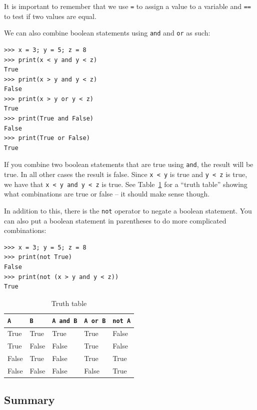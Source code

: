 \documentclass[11pt]{cselabheader}
\begin{document}
It is important to remember that we use \lstinline{=} to assign a value to a variable and \lstinline{==} to test if two values are equal.

We can also combine boolean statements using \lstinline!and! and \lstinline!or!
as such:
\begin{lstlisting}[style=ipython]
>>> x = 3; y = 5; z = 8
>>> print(x < y and y < z)
True
>>> print(x > y and y < z)
False
>>> print(x > y or y < z)
True
>>> print(True and False)
False
>>> print(True or False)
True
\end{lstlisting}
If you combine two boolean statements that are true using \lstinline!and!, the
result will be true. In all other cases the result is false. Since 
\lstinline!x < y! is true and \lstinline!y < z! is true, we have that 
\lstinline!x < y and y < z! is true. See Table~\ref{tab:truth} for a ``truth
table'' showing what combinations are true or false -- it should make sense
though.

In addition to this, there is the \lstinline!not! operator to negate a boolean
statement. You can also put a boolean statement in parentheses to do more
complicated combinations:
\begin{lstlisting}[style=ipython]
>>> x = 3; y = 5; z = 8
>>> print(not True)
False
>>> print(not (x > y and y < z))
True
\end{lstlisting}

\begin{table}[!ht]
  \centering
  \begin{tabular}{ll | lll}
    \toprule
    \lstinline!A! & \lstinline!B! & \lstinline!A and B! & \lstinline!A or B! & \lstinline!not A! \\
    \midrule
    True & True & True & True & False\\
    True & False & False & True & False\\
    False & True & False & True & True\\
    False & False & False & False & True \\
    \bottomrule
  \end{tabular}
  \caption{Truth table}
  \label{tab:truth}
\end{table}

\subsection{Summary}
\end{document}
